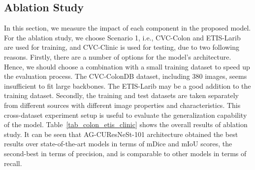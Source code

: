 \documentclass[review, sort&compress]{elsarticle}
\begin{document}
\subsection{Ablation Study}
In this section, we measure the impact of each component in the proposed model. For the ablation study, we choose Scenario 1, i.e., CVC-Colon and ETIS-Larib are used for training, and CVC-Clinic is used for testing, due to two following reasons. Firstly, there are a number of options for the model's architecture. Hence, we should choose a combination with a small training dataset to speed up the evaluation process. The CVC-ColonDB dataset, including 380 images, seems insufficient to fit large backbones. The ETIS-Larib may be a good addition to the training dataset. Secondly, the training and test datasets are taken separately from different sources with different image properties and characteristics. This cross-dataset experiment setup is useful to evaluate the generalization capability of the model. Table~\ref{tab_colon_etis_clinic} shows the overall results of ablation study. It can be seen that AG-CUResNeSt-101 architecture obtained the best results over state-of-the-art models in terms of mDice and mIoU scores, the second-best in terms of precision, and is comparable to other models in terms of recall.
\end{document}
